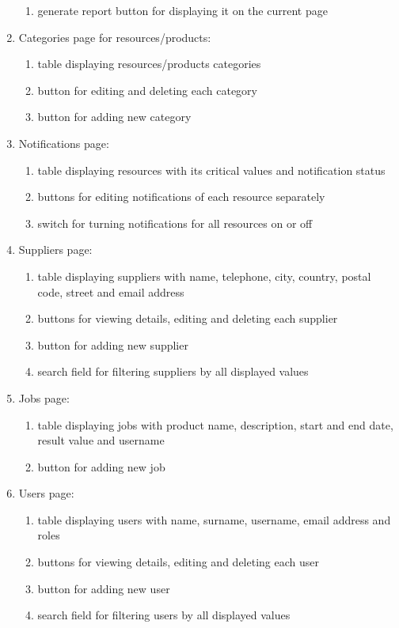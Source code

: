 \documentclass[a4paper,11pt,twoside]{report}
\theoremstyle{definition}
\begin{document}
\begin{enumerate}
\begin{enumerate}
\item generate report button for displaying it on the current page
\end{enumerate}
\item Categories page for resources/products:
\begin{enumerate}
\item table displaying resources/products categories
\item button for editing and deleting each category
\item button for adding new category
\end{enumerate}
\item Notifications page: 
\begin{enumerate}
\item table displaying resources with its critical values and notification status
\item buttons for editing notifications of each resource separately
\item switch for turning notifications for all resources on or off
\end{enumerate}
\item Suppliers page:
\begin{enumerate}
\item table displaying suppliers with name, telephone, city, country,  postal code, street and email address 
\item buttons for viewing details, editing and deleting each supplier
\item button for adding new supplier
\item search field for filtering suppliers by all displayed values
\end{enumerate}
\item Jobs page:
\begin{enumerate}
\item table displaying jobs with product name, description, start and end date, result value and username
\item button for adding new job
\end{enumerate}
\item Users page:
\begin{enumerate}
\item table displaying users with name, surname, username, email address and roles
\item buttons for viewing details, editing and deleting each user
\item button for adding new user
\item search field for filtering users by all displayed values
\end{enumerate}
\end{enumerate}
\end{document}
